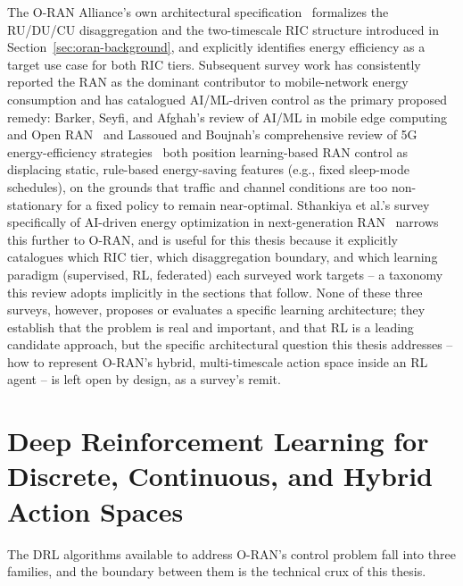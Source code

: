 The O-RAN Alliance's own architectural specification~\cite{oran2021mvp}
formalizes the RU/DU/CU disaggregation and the two-timescale RIC structure
introduced in Section~\ref{sec:oran-background}, and explicitly identifies
energy efficiency as a target use case for both RIC tiers. Subsequent survey
work has consistently reported the RAN as the dominant contributor to
mobile-network energy consumption and has catalogued AI/ML-driven control as
the primary proposed remedy: Barker, Seyfi, and Afghah's review of AI/ML in
mobile edge computing and Open RAN~\cite{barker2025mec} and Lassoued and
Boujnah's comprehensive review of 5G energy-efficiency
strategies~\cite{lassoued2026review} both position learning-based RAN
control as displacing static, rule-based energy-saving features (e.g.,
fixed sleep-mode schedules), on the grounds that traffic and channel
conditions are too non-stationary for a fixed policy to remain
near-optimal. Sthankiya et al.'s survey specifically of AI-driven energy
optimization in next-generation RAN~\cite{sthankiya2024survey} narrows this
further to O-RAN, and is useful for this thesis because it explicitly
catalogues which RIC tier, which disaggregation boundary, and which
learning paradigm (supervised, RL, federated) each surveyed work targets --
a taxonomy this review adopts implicitly in the sections that follow.
None of these three surveys, however, proposes or evaluates a specific
learning architecture; they establish that the problem is real and
important, and that RL is a leading candidate approach, but the specific
architectural question this thesis addresses -- how to represent O-RAN's
hybrid, multi-timescale action space inside an RL agent -- is left open by
design, as a survey's remit.

\section{Deep Reinforcement Learning for Discrete, Continuous, and Hybrid Action Spaces}
\label{sec:lit-drl-hybrid}

The DRL algorithms available to address O-RAN's control problem fall into
three families, and the boundary between them is the technical crux of this
thesis.

